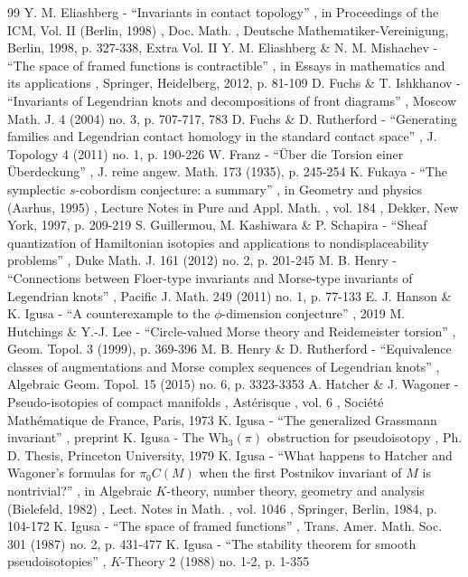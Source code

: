 \documentclass[11pt]{article}
\numberwithin{equation}{section}\providecommand{\dpl}{\displaystyle}
\theoremstyle{plain}
\theoremstyle{definition}
\begin{document}
\begin{thebibliography}{99}
 Y. M. Eliashberg - “Invariants in contact topology” , in Proceedings of the ICM, Vol. II (Berlin, 1998) , Doc. Math. , Deutsche Mathematiker-Vereinigung, Berlin, 1998, p. 327-338, Extra Vol. II
 Y. M. Eliashberg \& N. M. Mishachev - “The space of framed functions is contractible” , in Essays in mathematics and its applications , Springer, Heidelberg, 2012, p. 81-109
 D. Fuchs \& T. Ishkhanov - “Invariants of Legendrian knots and decompositions of front diagrams” , Moscow Math. J. 4 (2004) no. 3, p. 707-717, 783
 D. Fuchs \& D. Rutherford - “Generating families and Legendrian contact homology in the standard contact space” , J. Topology 4 (2011) no. 1, p. 190-226
 W. Franz - “Über die Torsion einer Überdeckung” , J. reine angew. Math. 173 (1935), p. 245-254
 K. Fukaya - “The symplectic $s$-cobordism conjecture: a summary” , in Geometry and physics (Aarhus, 1995) , Lecture Notes in Pure and Appl. Math. , vol. 184 , Dekker, New York, 1997, p. 209-219
 S. Guillermou, M. Kashiwara \& P. Schapira - “Sheaf quantization of Hamiltonian isotopies and applications to nondisplaceability problems” , Duke Math. J. 161 (2012) no. 2, p. 201-245
 M. B. Henry - “Connections between Floer-type invariants and Morse-type invariants of Legendrian knots” , Pacific J. Math. 249 (2011) no. 1, p. 77-133
 E. J. Hanson \& K. Igusa - “A counterexample to the $\phi $-dimension conjecture” , 2019
 M. Hutchings \& Y.-J. Lee - “Circle-valued Morse theory and Reidemeister torsion” , Geom. Topol. 3 (1999), p. 369-396
 M. B. Henry \& D. Rutherford - “Equivalence classes of augmentations and Morse complex sequences of Legendrian knots” , Algebraic Geom. Topol. 15 (2015) no. 6, p. 3323-3353
 A. Hatcher \& J. Wagoner - Pseudo-isotopies of compact manifolds , Astérisque , vol. 6 , Société Mathématique de France, Paris, 1973
 K. Igusa - “The generalized Grassmann invariant” , preprint
 K. Igusa - The $\mathrm{Wh}_3(\pi )$ obstruction for pseudoisotopy , Ph. D. Thesis, Princeton University, 1979
 K. Igusa - “What happens to Hatcher and Wagoner’s formulas for $\pi _{0}C(M)$ when the first Postnikov invariant of $M$ is nontrivial?” , in Algebraic $K$-theory, number theory, geometry and analysis (Bielefeld, 1982) , Lect. Notes in Math. , vol. 1046 , Springer, Berlin, 1984, p. 104-172
 K. Igusa - “The space of framed functions” , Trans. Amer. Math. Soc. 301 (1987) no. 2, p. 431-477
 K. Igusa - “The stability theorem for smooth pseudoisotopies” , $K$-Theory 2 (1988) no. 1-2, p. 1-355

\end{thebibliography}
\end{document}
